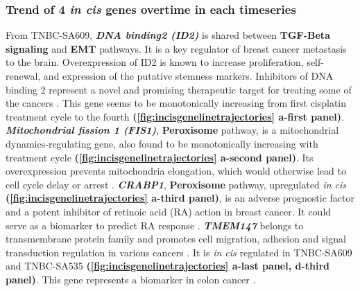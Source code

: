 
 \subsubsection{Trend of 4 \textit{in cis} genes overtime in each timeseries}
 From TNBC-SA609, \textit{\textbf{DNA binding2 (ID2)}} is shared between \textbf{TGF-Beta signaling} and \textbf{EMT} pathways. It is a key regulator of breast cancer metastasis to the brain. Overexpression of ID2 is known to increase proliferation, self-renewal, and expression of the putative stemness markers.  Inhibitors of DNA binding 2 represent a novel and promising therapeutic target for treating some of the cancers \cite{bae2017inhibitor, kijewska2019using}. This gene seems to be monotonically increasing from first cisplatin treatment cycle to the fourth \textbf{(\autoref{fig:incisgenelinetrajectories} a-first panel)}. \textit{\textbf{Mitochondrial fission 1 (FIS1)}}, \textbf{Peroxisome} pathway, is a mitochondrial dynamics-regulating gene, also found to be monotonically increasing with treatment cycle \textbf{(\autoref{fig:incisgenelinetrajectories} a-second panel)}. Its overexpression prevents mitochondria elongation, which would otherwise lead to cell cycle delay or arrest \cite{fan2015mir, anderson2018dysregulation}. \textit{\textbf{CRABP1}}, \textbf{Peroxisome} pathway, upregulated \textit{in cis} \textbf{(\autoref{fig:incisgenelinetrajectories} a-third panel)}, is an adverse prognostic factor and a potent inhibitor of retinoic acid (RA) action in breast cancer. It could serve as a biomarker to predict RA response \cite{liu2015crabp1}. \textit{\textbf{TMEM147}} belongs to transmembrane protein family and promotes cell migration, adhesion and signal transduction regulation in various cancers \cite{yu2011knockdown}. It is \textit{in cis} regulated in TNBC-SA609 and TNBC-SA535 \textbf{(\autoref{fig:incisgenelinetrajectories} a-last panel, d-third panel)}. This gene represents a biomarker in colon cancer \cite{feng2019identification}. 
 

